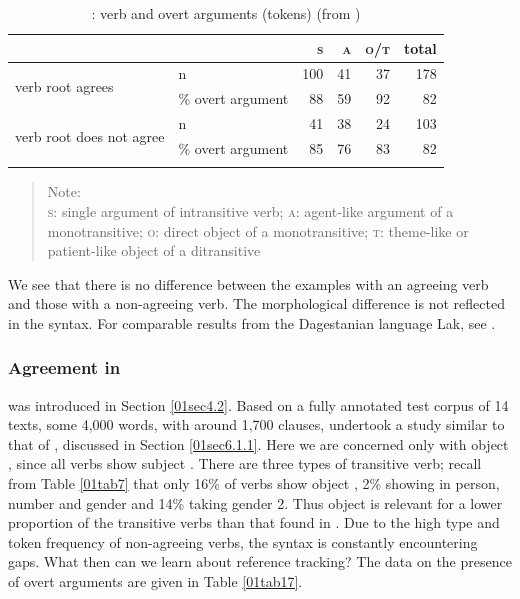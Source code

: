 \documentclass[output=paper,colorlinks,citecolor=brown]{langscibook}
\begin{document}
\begin{table}[ht]
	\centering
	\caption{: verb  and overt arguments (tokens) (from \citealt[858]{nichols2018})}
	\label{01tab16}
	\begin{tabularx}{0.95\textwidth}{llrrrr}
		\lsptoprule
			& & \textsc{s} & \textsc{a} & \textsc{o/t} & total \\
			\midrule
			\multirow{2}{*}{verb root agrees} & n & 100 & 41 & 37 & 178 \\
			& \% overt argument & 88 & 59 &	92 & \cellcolor{gray!25}82 \\
			\midrule
			\multirow{2}{*}{verb root does not agree} & n & 41 & 38 & 24 & 103 \\
			& \% overt argument & 85 & 76 &	83 & \cellcolor{gray!25}82 \\			
		\lspbottomrule
	\end{tabularx}

\begin{quote}
	Note: \\
	\textsc{s}: single argument of intransitive verb; \textsc{a}: agent-like argument of a monotransitive; \textsc{o}: direct object of a monotransitive; \textsc{t}: theme-like or patient-like object of a ditransitive
\end{quote}
\vspace*{-0.7cm}
\end{table}

We see that there is no difference between the examples with an agreeing verb and those with a non-agreeing verb. The morphological difference is not reflected in the syntax. For comparable results from the Dagestanian language Lak, see \citet{forker2018}.

\subsubsection{Agreement in } \label{01sec6.1.2}

 was introduced in Section \ref{01sec4.2}. Based on a fully annotated  test corpus of 14 texts, some 4,000 words, with around 1,700 clauses, \citet{fedden2022} undertook a study similar to that of \citet{nichols2018}, discussed in Section \ref{01sec6.1.1}. Here we are concerned only with object , since all verbs show subject . There are three types of transitive verb; recall from Table \ref{01tab7} that only 16\% of  verbs show object , 2\% showing  in person, number and gender and 14\% taking gender 2. Thus object  is relevant for a lower proportion of the transitive verbs than that found in . Due to the high type and token frequency of non-agreeing verbs, the syntax is constantly encountering gaps. What then can we learn about reference tracking? The data on the presence of overt arguments are given in Table \ref{01tab17}.
\end{document}
